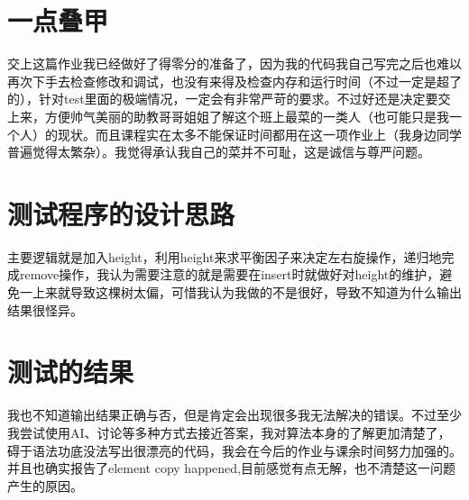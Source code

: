 \documentclass[UTF8]{ctexart}
\begin{document}
\pagestyle{fancy}
\fancyhead{}

\section{一点叠甲}

交上这篇作业我已经做好了得零分的准备了，因为我的代码我自己写完之后也难以再次下手去检查修改和调试，也没有来得及检查内存和运行时间（不过一定是超了的），针对test里面的极端情况，一定会有非常严苛的要求。不过好还是决定要交上来，方便帅气美丽的助教哥哥姐姐了解这个班上最菜的一类人（也可能只是我一个人）的现状。而且课程实在太多不能保证时间都用在这一项作业上（我身边同学普遍觉得太繁杂）。我觉得承认我自己的菜并不可耻，这是诚信与尊严问题。

\section{测试程序的设计思路}

主要逻辑就是加入height，利用height来求平衡因子来决定左右旋操作，递归地完成remove操作，我认为需要注意的就是需要在insert时就做好对height的维护，避免一上来就导致这棵树太偏，可惜我认为我做的不是很好，导致不知道为什么输出结果很怪异。

\section{测试的结果}

我也不知道输出结果正确与否，但是肯定会出现很多我无法解决的错误。不过至少我尝试使用AI、讨论等多种方式去接近答案，我对算法本身的了解更加清楚了，碍于语法功底没法写出很漂亮的代码，我会在今后的作业与课余时间努力加强的。并且也确实报告了element copy happened,目前感觉有点无解，也不清楚这一问题产生的原因。
\end{document}
